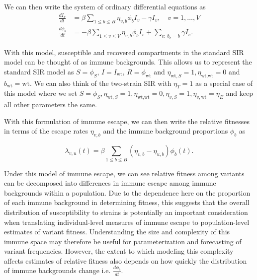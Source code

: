 \documentclass[12pt,oneside,letterpaper]{article}
\newcommand{\wt}{\text{wt}}
\def\tbc#1{\textcolor{purple}{[#1]}}
\begin{document}
We can then write the system of ordinary differential equations as
\begin{align*}
    \frac{d I_{v}}{dt} &= \beta \sum_{1\leq b \leq B} \eta_{v, b} \phi_{b} I_{v} - \gamma I_{v}, \quad v = 1, \ldots, V\\
    \frac{d \phi_{b}}{dt} &= - \beta \sum_{1\leq v \leq V} \eta_{v,b}\phi_{b} I_{v} +  \sum_{v:\ b_{v} = b} \gamma I_{v}.
\end{align*}

With this model, susceptible and recovered compartments in the standard SIR model can be thought of as immune backgrounds.
This allows us to represent the standard SIR model as $S = \phi_{S}$, $I = I_{\wt}$, $R = \phi_{\wt}$ and $\eta_{\wt, S} = 1, \eta_{\wt, \wt} = 0$ and $b_{\wt} = \wt$.
We can also think of the two-strain SIR with $\eta_{T} = 1$ as a special case of this model where we set $S = \phi_{S}, \eta_{\wt, S} = 1, \eta_{\wt, \wt} = 0, \eta_{v, S} = 1, \eta_{v, \wt} = \eta_{E}$ and keep all other parameters the same.

With this formulation of immune escape, we can then write the relative fitnesses in terms of the escape rates $\eta_{v,b}$ and the immune background proportions $\phi_{b}$ as

\begin{equation} \label{eq:escape_relative_fitness}
    \lambda_{v, u}(t) = \beta \sum_{1\leq b \leq B}(\eta_{v,b} - \eta_{u,b}) \phi_{b}(t).
\end{equation}

Under this model of immune escape, we can see relative fitness among variants can be decomposed into differences in immune escape among immune backgrounds within a population.
Due to the dependence here on the proportion of each immune background in determining fitness, this suggests that the overall distribution of susceptibility to strains is potentially an important consideration when translating individual-level measures of immune escape to population-level estimates of variant fitness.
Understanding the size and complexity of this immune space may therefore be useful for parameterization and forecasting of variant frequencies.
However, the extent to which modeling this complexity affects estimates of relative fitness also depends on how quickly the distribution of immune backgrounds change i.e. $\frac{d\phi_{b}}{dt}$.

\end{document}
